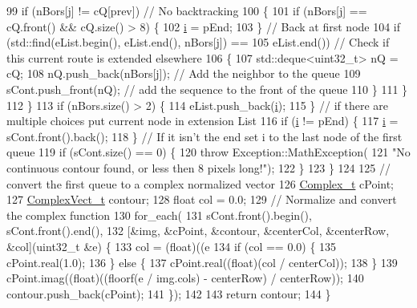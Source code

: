 \begin{DoxyCode}
99       \textcolor{keywordflow}{if} (nBors[\hyperlink{_comparision_pictures_2_createtest_image_8m_ac86694252f8dfdb19aaeadc4b7c342c6}{j}] != cQ[prev]) \textcolor{comment}{// No backtracking}
100       \{
101         \textcolor{keywordflow}{if} (nBors[\hyperlink{_comparision_pictures_2_createtest_image_8m_ac86694252f8dfdb19aaeadc4b7c342c6}{j}] == cQ.front() && cQ.size() > 8) \{
102           \hyperlink{_comparision_pictures_2_createtest_image_8m_a6f6ccfcf58b31cb6412107d9d5281426}{i} = pEnd;
103         \} \textcolor{comment}{// Back at first node}
104         \textcolor{keywordflow}{if} (std::find(eList.begin(), eList.end(), nBors[\hyperlink{_comparision_pictures_2_createtest_image_8m_ac86694252f8dfdb19aaeadc4b7c342c6}{j}]) ==
105             eList.end()) \textcolor{comment}{// Check if this current route is extended elsewhere}
106         \{
107           std::deque<uint32\_t> nQ = cQ;
108           nQ.push\_back(nBors[\hyperlink{_comparision_pictures_2_createtest_image_8m_ac86694252f8dfdb19aaeadc4b7c342c6}{j}]); \textcolor{comment}{// Add the neighbor to the queue}
109           sCont.push\_front(nQ);   \textcolor{comment}{// add the sequence to the front of the queue}
110         \}
111       \}
112     \}
113     \textcolor{keywordflow}{if} (nBors.size() > 2) \{
114       eList.push\_back(\hyperlink{_comparision_pictures_2_createtest_image_8m_a6f6ccfcf58b31cb6412107d9d5281426}{i});
115     \} \textcolor{comment}{// if there are multiple choices put current node in extension List}
116     \textcolor{keywordflow}{if} (\hyperlink{_comparision_pictures_2_createtest_image_8m_a6f6ccfcf58b31cb6412107d9d5281426}{i} != pEnd) \{
117       \hyperlink{_comparision_pictures_2_createtest_image_8m_a6f6ccfcf58b31cb6412107d9d5281426}{i} = sCont.front().back();
118     \} \textcolor{comment}{// If it isn't the end set i to the last node of the first queue}
119     \textcolor{keywordflow}{if} (sCont.size() == 0) \{
120       \textcolor{keywordflow}{throw} Exception::MathException(
121           \textcolor{stringliteral}{"No continuous contour found, or less then 8 pixels long!"});
122     \}
123   \}
124 
125   \textcolor{comment}{// convert the first queue to a complex normalized vector}
126   \hyperlink{_soil_math_types_8h_a26c307796ad803485b0376c90026d8f7}{Complex\_t} cPoint;
127   \hyperlink{_soil_math_types_8h_a7567e521c2b2c408dcb62dbff72390f7}{ComplexVect\_t} contour;
128   \textcolor{keywordtype}{float} col = 0.0;
129   \textcolor{comment}{// Normalize and convert the complex function}
130   for\_each(
131       sCont.front().begin(), sCont.front().end(),
132       [&img, &cPoint, &contour, &centerCol, &centerRow, &col](uint32\_t &e) \{
133         col = (float)((e %
134         \textcolor{keywordflow}{if} (col == 0.0) \{
135           cPoint.real(1.0);
136         \} \textcolor{keywordflow}{else} \{
137           cPoint.real((\textcolor{keywordtype}{float})(col / centerCol));
138         \}
139         cPoint.imag((\textcolor{keywordtype}{float})((floorf(e / img.cols) - centerRow) / centerRow));
140         contour.push\_back(cPoint);
141       \});
142 
143   \textcolor{keywordflow}{return} contour;
144 \}
\end{DoxyCode}


